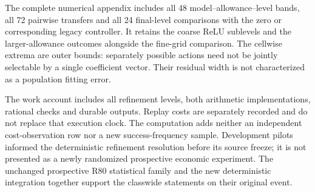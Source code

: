 The complete numerical appendix includes all 48 model--allowance--level bands, all 72 pairwise transfers and all 24 final-level comparisons with the zero or corresponding legacy controller. It retains the coarse ReLU sublevels and the larger-allowance outcomes alongside the fine-grid comparison. The cellwise extrema are outer bounds: separately possible actions need not be jointly selectable by a single coefficient vector. Their residual width is not characterized as a population fitting error.


The work account includes all refinement levels, both arithmetic implementations, rational checks and durable outputs. Replay costs are separately recorded and do not replace that execution clock. The computation adds neither an independent cost-observation row nor a new success-frequency sample. Development pilots informed the deterministic refinement resolution before its source freeze; it is not presented as a newly randomized prospective economic experiment. The unchanged prospective R80 statistical family and the new deterministic integration together support the classwide statements on their original event.
